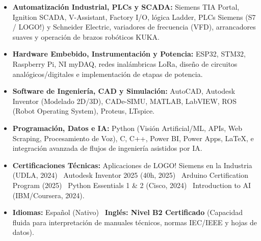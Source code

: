 \documentclass[10pt,a4paper]{article}
\begin{document}
\begin{itemize}
    \item \textbf{Automatización Industrial, PLCs y SCADA:} Siemens TIA Portal, Ignition SCADA, V-Assistant, Factory I/O, lógica Ladder, PLCs Siemens (S7 / LOGO!) y Schneider Electric, variadores de frecuencia (VFD), arrancadores suaves y operación de brazos robóticos KUKA.
    \item \textbf{Hardware Embebido, Instrumentación y Potencia:} ESP32, STM32, Raspberry Pi, NI myDAQ, redes inalámbricas LoRa, diseño de circuitos analógicos/digitales e implementación de etapas de potencia.
    \item \textbf{Software de Ingeniería, CAD y Simulación:} AutoCAD, Autodesk Inventor (Modelado 2D/3D), CADe-SIMU, MATLAB, LabVIEW, ROS (Robot Operating System), Proteus, LTspice.
    \item \textbf{Programación, Datos e IA:} Python (Visión Artificial/ML, APIs, Web Scraping, Procesamiento de Voz), C, C++, Power BI, Power Apps, LaTeX, e integración avanzada de flujos de ingeniería asistidos por IA.
    \item \textbf{Certificaciones Técnicas:} Aplicaciones de LOGO! Siemens en la Industria (UDLA, 2024) \textbar\ Autodesk Inventor 2025 (40h, 2025) \textbar\ Arduino Certification Program (2025) \textbar\ Python Essentials 1 \& 2 (Cisco, 2024) \textbar\ Introduction to AI (IBM/Coursera, 2024).
    \item \textbf{Idiomas:} Español (Nativo) \textbar\ \textbf{Inglés: Nivel B2 Certificado} (Capacidad fluida para interpretación de manuales técnicos, normas IEC/IEEE y hojas de datos).
\end{itemize}
\end{document}
